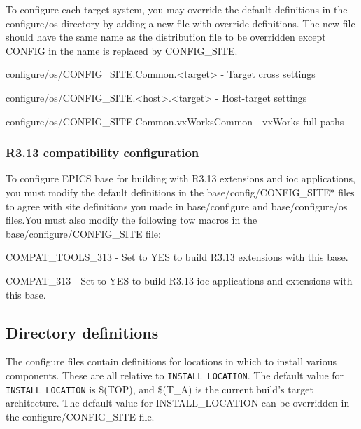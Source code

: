 To configure each target system, you may override the default definitions in the configure/os directory by adding a new 
file with override definitions. The new file should have the same name as the distribution file to be overridden except 
CONFIG in the name is replaced by CONFIG\_SITE.

\begin{description}\item configure/os/CONFIG\_SITE.Common.\textless{}target\textgreater{} - Target cross settings

\item configure/os/CONFIG\_SITE.\textless{}host\textgreater{}.\textless{}target\textgreater{} - Host-target settings

\item configure/os/CONFIG\_SITE.Common.vxWorksCommon - vxWorks full paths

\end{description}\subsubsection{R3.13 compatibility configuration}

To configure EPICS base for building with R3.13 extensions and ioc applications, you must modify the default definitions 
in the base/config/CONFIG\_SITE* files to agree with site definitions you made in base/configure and base/configure/os 
files.You must also modify the following tow macros in the base/configure/CONFIG\_SITE file:

\begin{description}\item {}COMPAT\_TOOLS\_313 - Set to YES to build R3.13 extensions with this base.

\item {}COMPAT\_313 - Set to YES to build R3.13 ioc applications and extensions with this base.

\end{description}

\subsection{Directory definitions}

The configure files contain definitions for locations in which to install various components. These are all relative to 
\verb|INSTALL_LOCATION|. The default value for \verb|INSTALL_LOCATION| is \$(TOP), and \$(T\_A) is the current build's target 
architecture. The default value for INSTALL\_LOCATION can be overridden in the configure/CONFIG\_SITE file. 

